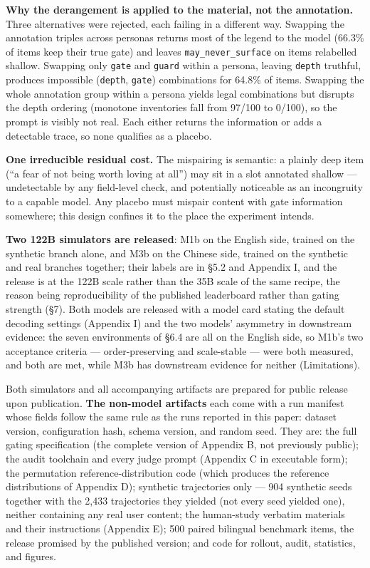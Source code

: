 \documentclass[letterpaper]{article}
\begin{document}
\textbf{Why the derangement is applied to the material, not the annotation.} Three alternatives were rejected, each failing in a different way. Swapping the annotation triples across personas returns most of the legend to the model (66.3\% of items keep their true gate) and leaves \texttt{may\_never\_surface} on items relabelled shallow. Swapping only \texttt{gate} and \texttt{guard} within a persona, leaving \texttt{depth} truthful, produces impossible (\texttt{depth}, \texttt{gate}) combinations for 64.8\% of items. Swapping the whole annotation group within a persona yields legal combinations but disrupts the depth ordering (monotone inventories fall from 97/100 to 0/100), so the prompt is visibly not real. Each either returns the information or adds a detectable trace, so none qualifies as a placebo.

\textbf{One irreducible residual cost.} The mispairing is semantic: a plainly deep item (``a fear of not being worth loving at all'') may sit in a slot annotated shallow --- undetectable by any field-level check, and potentially noticeable as an incongruity to a capable model. Any placebo must mispair content with gate information somewhere; this design confines it to the place the experiment intends.




\textbf{Two 122B simulators are released}: M1b on the English side, trained on the synthetic branch alone, and M3b on the Chinese side, trained on the synthetic and real branches together; their labels are in \S{}5.2 and Appendix I, and the release is at the 122B scale rather than the 35B scale of the same recipe, the reason being reproducibility of the published leaderboard rather than gating strength (\S{}7). Both models are released with a model card stating the default decoding settings (Appendix I) and the two models' asymmetry in downstream evidence: the seven environments of \S{}6.4 are all on the English side, so M1b's two acceptance criteria --- order-preserving and scale-stable --- were both measured, and both are met, while M3b has downstream evidence for neither (Limitations).

Both simulators and all accompanying artifacts are prepared for public release upon publication. \textbf{The non-model artifacts} each come with a run manifest whose fields follow the same rule as the runs reported in this paper: dataset version, configuration hash, schema version, and random seed. They are: the full gating specification (the complete version of Appendix B, not previously public); the audit toolchain and every judge prompt (Appendix C in executable form); the permutation reference-distribution code (which produces the reference distributions of Appendix D); synthetic trajectories only --- 904 synthetic seeds together with the 2,433 trajectories they yielded (not every seed yielded one), neither containing any real user content; the human-study verbatim materials and their instructions (Appendix E); 500 paired bilingual benchmark items, the release promised by the published version; and code for rollout, audit, statistics, and figures.
\end{document}
